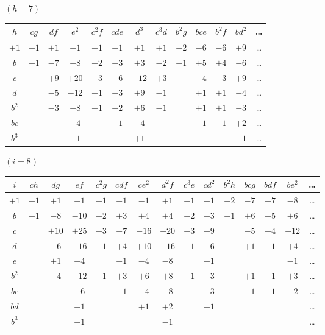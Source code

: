 \documentclass[11pt,a4paper]{book}
\begin{document}
\noindent $(h = 7)$
\begin{center}
\small
\begin{tabular}{|c|c|c|c|c|c|c|c|c|c|c|c|c|}
\hline
$h$ & $cg$ & $df$ & $e^2$ & $c^2f$ & $cde$ & $d^3$ & $c^3d$ & $b^2g$ & $bce$ & $b^2f$ & $bd^2$ & \dots \\
\hline
$+1$ & $+1$ & $+1$ & $+1$ & $-1$ & $-1$ & $+1$ & $+1$ & $+2$ & $-6$ & $-6$ & $+9$ & \dots \\
$b$ & $-1$ & $-7$ & $-8$ & $+2$ & $+3$ & $+3$ & $-2$ & $-1$ & $+5$ & $+4$ & $-6$ & \dots \\
$c$ & & $+9$ & $+20$ & $-3$ & $-6$ & $-12$ & $+3$ & & $-4$ & $-3$ & $+9$ & \dots \\
$d$ & & $-5$ & $-12$ & $+1$ & $+3$ & $+9$ & $-1$ & & $+1$ & $+1$ & $-4$ & \dots \\
$b^2$ & & $-3$ & $-8$ & $+1$ & $+2$ & $+6$ & $-1$ & & $+1$ & $+1$ & $-3$ & \dots \\
$bc$ & & & $+4$ & & $-1$ & $-4$ & & & $-1$ & $-1$ & $+2$ & \dots \\
$b^3$ & & & $+1$ & & & $+1$ & & & & & $-1$ & \dots \\
\hline
\end{tabular}
\end{center}

\medskip

\noindent $(i = 8)$
\begin{center}
\small
\begin{tabular}{|c|c|c|c|c|c|c|c|c|c|c|c|c|c|c|}
\hline
$i$ & $ch$ & $dg$ & $ef$ & $c^2g$ & $cdf$ & $ce^2$ & $d^2f$ & $c^3e$ & $cd^2$ & $b^2h$ & $bcg$ & $bdf$ & $be^2$ & \dots \\
\hline
$+1$ & $+1$ & $+1$ & $+1$ & $-1$ & $-1$ & $-1$ & $+1$ & $+1$ & $+1$ & $+2$ & $-7$ & $-7$ & $-8$ & \dots \\
$b$ & $-1$ & $-8$ & $-10$ & $+2$ & $+3$ & $+4$ & $+4$ & $-2$ & $-3$ & $-1$ & $+6$ & $+5$ & $+6$ & \dots \\
$c$ & & $+10$ & $+25$ & $-3$ & $-7$ & $-16$ & $-20$ & $+3$ & $+9$ & & $-5$ & $-4$ & $-12$ & \dots \\
$d$ & & $-6$ & $-16$ & $+1$ & $+4$ & $+10$ & $+16$ & $-1$ & $-6$ & & $+1$ & $+1$ & $+4$ & \dots \\
$e$ & & $+1$ & $+4$ & & $-1$ & $-4$ & $-8$ & & $+1$ & & & & $-1$ & \dots \\
$b^2$ & & $-4$ & $-12$ & $+1$ & $+3$ & $+6$ & $+8$ & $-1$ & $-3$ & & $+1$ & $+1$ & $+3$ & \dots \\
$bc$ & & & $+6$ & & $-1$ & $-4$ & $-8$ & & $+3$ & & $-1$ & $-1$ & $-2$ & \dots \\
$bd$ & & & $-1$ & & & $+1$ & $+2$ & & $-1$ & & & & & \dots \\
$b^3$ & & & $+1$ & & & & $-1$ & & & & & & & \dots \\
\hline
\end{tabular}
\end{center}
\end{document}
